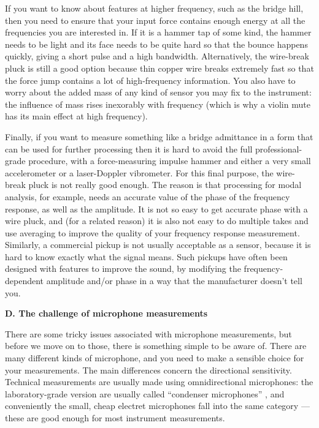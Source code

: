   If you want to know about features at higher frequency, such as the bridge 
  hill, then you need to ensure that your input force contains enough energy at 
  all the frequencies you are interested in. If it is a hammer tap of some 
  kind, the hammer needs to be light and its face needs to be quite hard so 
  that the bounce happens quickly, giving a short pulse and a high bandwidth. 
  Alternatively, the wire-break pluck is still a good option because thin 
  copper wire breaks extremely fast so that the force jump contains a lot of 
  high-frequency information. You also have to worry about the added mass of 
  any kind of sensor you may fix to the instrument: the influence of mass rises 
  inexorably with frequency (which is why a violin mute has its main effect at 
  high frequency). 

  Finally, if you want to measure something like a bridge admittance in a form 
  that can be used for further processing then it is hard to avoid the full 
  professional-grade procedure, with a force-measuring impulse hammer and 
  either a very small accelerometer or a laser-Doppler vibrometer. For this 
  final purpose, the wire-break pluck is not really good enough. The reason is 
  that processing for modal analysis, for example, needs an accurate value of 
  the phase of the frequency response, as well as the amplitude. It is not so 
  easy to get accurate phase with a wire pluck, and (for a related reason) it 
  is also not easy to do multiple takes and use averaging to improve the 
  quality of your frequency response measurement. Similarly, a commercial 
  pickup is not usually acceptable as a sensor, because it is hard to know 
  exactly what the signal means. Such pickups have often been designed with 
  features to improve the sound, by modifying the frequency-dependent amplitude 
  and/or phase in a way that the manufacturer doesn't tell you. 

  \textbf{D. The challenge of microphone measurements} 

  There are some tricky issues associated with microphone measurements, but 
  before we move on to those, there is something simple to be aware of. There 
  are many different kinds of microphone, and you need to make a sensible 
  choice for your measurements. The main differences concern the directional 
  sensitivity. Technical measurements are usually made using omnidirectional 
  microphones: the laboratory-grade version are usually called ``condenser 
  microphones'' , and conveniently the small, cheap electret microphones fall 
  into the same category --- these are good enough for most instrument 
  measurements. 

